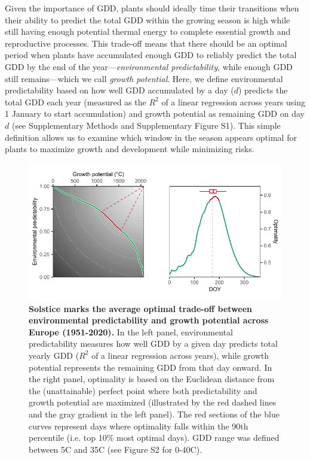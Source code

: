 \documentclass[11pt,letter]{article}
\begin{document}
Given the importance of GDD, plants should ideally time their transitions when their ability to predict the total GDD within the growing season is high while still having enough potential thermal energy to complete essential growth and reproductive processes. This trade-off means that there should be an optimal period when plants have accumulated enough GDD to reliably predict the total GDD by the end of the year---\emph{environmental predictability}, while enough GDD still remains---which we call \emph{growth potential}. Here, we define environmental predictability based on how well GDD accumulated by a day ($d$) predicts the total GDD each year (measured as the $R^2$ of a linear regression across years using 1 January to start accumulation) and growth potential as remaining GDD on day $d$ (see Supplementary Methods and Supplementary Figure S1). %
This simple definition allows us to examine which window in the season appears optimal for plants to maximize growth and development while minimizing risks.

\begin{figure}[h]
\centering
\includegraphics{global_optimality.pdf}
\vspace*{-0.7cm}
\caption{\textbf{Solstice marks the average optimal trade-off between environmental predictability and growth potential across Europe (1951-2020).} In the left panel, environmental predictability measures how well GDD by a given day predicts total yearly GDD ($R^2$ of a linear regression across years), while growth potential represents the remaining GDD from that day onward. In the right panel, optimality is based on the Euclidean distance from the (unattainable) perfect point where both predictability and growth potential are maximized (illustrated by the red dashed lines and the gray gradient in the left panel). The red sections of the blue curves represent days where optimality falls within the 90th percentile (i.e. top 10\% most optimal days). GDD range was defined between 5\degree C and 35\degree C (see Figure S2 for 0-40\degree C).} 
\label{fig:globaloptimality}
\end{figure}
\end{document}
